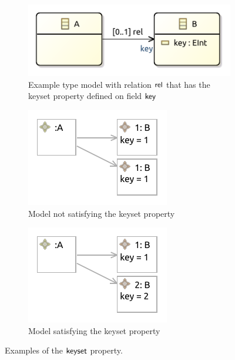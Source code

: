 \begin{figure}[p]
    \centering
    \begin{subfigure}{0.45\textwidth}
        \centering
        \includegraphics{images/03_formalisations/02_ecore_formalisation/properties/keyset/type_model.pdf}
        \caption{Example type model with relation $\mathsf{rel}$ that has the keyset property defined on field $\mathsf{key}$}
        \label{fig:formalisations:ecore_formalisation:instance_models:properties:keyset:type_model}
    \end{subfigure}
    \begin{subfigure}{0.25\textwidth}
        \centering
        \includegraphics{images/03_formalisations/02_ecore_formalisation/properties/keyset/invalid.pdf}
        \caption{Model not satisfying the keyset property}
        \label{fig:formalisations:ecore_formalisation:instance_models:properties:keyset:invalid}
    \end{subfigure}
    \begin{subfigure}{0.25\textwidth}
        \centering
        \includegraphics{images/03_formalisations/02_ecore_formalisation/properties/keyset/valid.pdf}
        \caption{Model satisfying the keyset property}
        \label{fig:formalisations:ecore_formalisation:instance_models:properties:keyset:valid}
    \end{subfigure}
    \caption{Examples of the $\mathsf{keyset}$ property.}
    \label{fig:formalisations:ecore_formalisation:instance_models:properties:keyset}
\end{figure}

